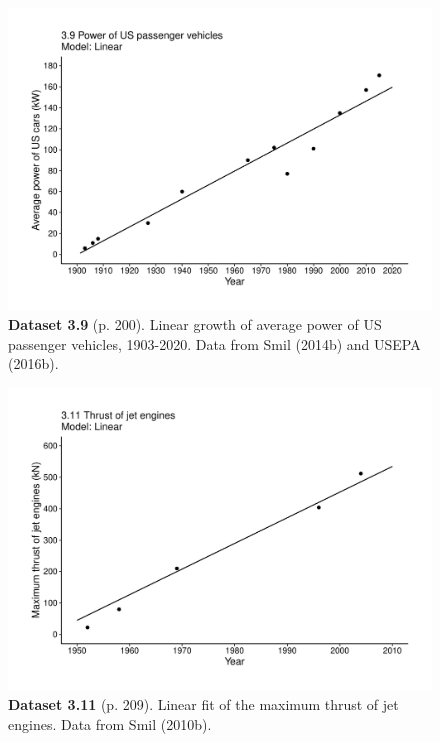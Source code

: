 \documentclass[aps,rmp,preprint,superscriptaddress,10pt,onecolumn]{article}
\begin{document}
\clearpage
\begin{figure}[h]
\includegraphics[width=\textwidth]{output/figs-ggplot/3.9.pdf}
\caption*{\textbf{Dataset 3.9} (p. 200). Linear growth of average power of US passenger vehicles, 1903-2020. Data from Smil (2014b) and USEPA (2016b).}
\end{figure}
	
\clearpage
\begin{figure}[h]
\includegraphics[width=\textwidth]{output/figs-ggplot/3.11.pdf}
\caption*{\textbf{Dataset 3.11} (p. 209). Linear fit of the maximum thrust of jet engines. Data from Smil (2010b).}
\end{figure}
	
\end{document}
